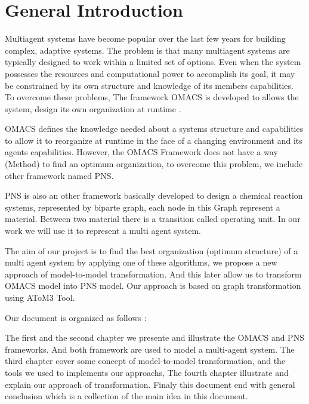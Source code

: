 \chapter*{General Introduction}

\textbf{}



Multiagent systems have become popular over the last few years for building complex, adaptive systems. 
The problem is that many multiagent systems are typically designed to work within 
a limited set of options. Even when the system possesses the resources and
computational power to accomplish its goal, it may be constrained by its own structure and knowledge
of its members capabilities. To overcome these problems, The framework OMACS is developed to allows the system, design its own organization at runtime \cite{omacs4}.

OMACS defines the knowledge needed about a systems structure and capabilities to allow it to reorganize at runtime in the face of a changing environment and its agents capabilities\cite{omacs4}\cite{omacs2}.
However, the OMACS Framework does not have a way (Method) to find an optimum organization, to overcome this problem, we include other framework named PNS.

PNS is also an other framework basically developed to design a chemical reaction systems, represented by biparte graph, each node in this Graph represent a material. Between two material there is a transition called operating unit. In our work we will use it to represent a multi agent system. 


The aim of our project is to find the best organization (optimum structure) of a multi agent system by applying one of these algorithms, we propose a new approach of model-to-model transformation. And this later allow us to transform OMACS model into PNS model. Our approach is based on graph transformation using AToM3 Tool.


Our document is organized as follows :

The first and the second chapter we presente and illustrate the OMACS and PNS frameworks. And both framework are used to model a multi-agent system.
The third chapter cover some concept of model-to-model transformation, and the tools we used to implements our approachs, The fourth chapter illustrate and explain our approach of transformation. 
Finaly this document end with general conclusion which is a collection of the main idea in this document.

 



